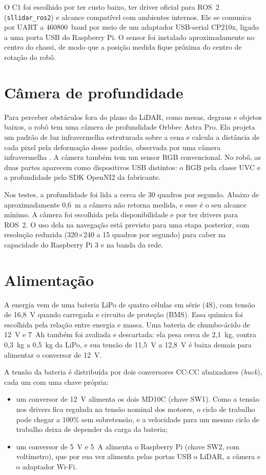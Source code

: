 O C1 foi escolhido por ter custo baixo, ter driver oficial para ROS~2
(\texttt{sllidar\_ros2}) e alcance compatível com ambientes internos. Ele
se comunica por UART a 460800~baud por meio de um adaptador USB-serial
CP210x, ligado a uma porta USB do Raspberry Pi. O sensor foi instalado
aproximadamente no centro do chassi, de modo que a posição medida fique
próxima do centro de rotação do robô.

\section{Câmera de profundidade}

Para perceber obstáculos fora do plano do LiDAR, como mesas, degraus e
objetos baixos, o robô tem uma câmera de profundidade Orbbec Astra Pro.
Ela projeta um padrão de luz infravermelha estruturada sobre a cena e
calcula a distância de cada pixel pela deformação desse padrão, observada
por uma câmera infravermelha \cite{orbbecastra}. A câmera também tem um
sensor RGB convencional. No robô, as duas partes aparecem como
dispositivos USB distintos: o RGB pela classe UVC e a profundidade pelo
SDK OpenNI2 da fabricante.

Nos testes, a profundidade foi lida a cerca de 30 quadros por segundo.
Abaixo de aproximadamente 0,6~m a câmera não retorna medida, e esse é o
seu alcance mínimo. A câmera foi escolhida pela disponibilidade e por ter
drivers para ROS~2. O uso dela na navegação está previsto para uma etapa
posterior, com resolução reduzida (320$\times$240 a 15 quadros por
segundo) para caber na capacidade do Raspberry Pi 3 e na banda da rede.

\section{Alimentação}

A energia vem de uma bateria LiPo de quatro células em série (4S), com
tensão de 16,8~V quando carregada e circuito de proteção (BMS). Essa
química foi escolhida pela relação entre energia e massa. Uma bateria de
chumbo-ácido de 12~V e 7~Ah também foi avaliada e descartada: ela pesa
cerca de 2,1~kg, contra 0,3~kg a 0,5~kg da LiPo, e sua tensão de 11,5~V a
12,8~V é baixa demais para alimentar o conversor de 12~V.

A tensão da bateria é distribuída por dois conversores CC-CC abaixadores
(\textit{buck}), cada um com uma chave própria:

\begin{itemize}
	\item um conversor de 12~V alimenta os dois MD10C (chave SW1). Como a
	tensão nos drivers fica regulada na tensão nominal dos motores, o
	ciclo de trabalho pode chegar a 100\% sem sobretensão, e a velocidade
	para um mesmo ciclo de trabalho deixa de depender da carga da
	bateria;
	\item um conversor de 5~V e 5~A alimenta o Raspberry Pi (chave SW2,
	com voltímetro), que por sua vez alimenta pelas portas USB o LiDAR, a
	câmera e o adaptador Wi-Fi.
\end{itemize}

